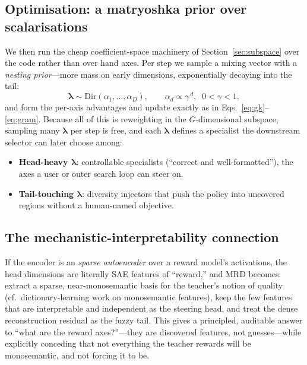 \documentclass[11pt,a4paper]{article}
\begin{document}
\subsection{Optimisation: a matryoshka prior over scalarisations}

We then run the cheap coefficient-space machinery of
Section~\ref{sec:subspace} over the code rather than over hand axes.  Per
step we sample a mixing vector with a \emph{nesting prior}---more mass on
early dimensions, exponentially decaying into the tail:
\begin{equation}
  \bm\lambda \sim \mathrm{Dir}(\alpha_1,\dots,\alpha_D),
  \qquad \alpha_d \propto \gamma^{\,d},\;\; 0<\gamma<1,
\end{equation}
and form the per-axis advantages and update exactly as in
Eqs.~\eqref{eq:gk}--\eqref{eq:gram}.  Because all of this is reweighting in
the $G$-dimensional subspace, sampling many $\bm\lambda$ per step is free,
and each $\bm\lambda$ defines a specialist the downstream selector can later
choose among:

\begin{itemize}[nosep]
\item \textbf{Head-heavy $\bm\lambda$}: controllable specialists (``correct
  and well-formatted''), the axes a user or outer search loop can steer on.
\item \textbf{Tail-touching $\bm\lambda$}: diversity injectors that push the
  policy into uncovered regions without a human-named objective.
\end{itemize}

\subsection{The mechanistic-interpretability connection}

If the encoder is an \emph{sparse autoencoder} over a reward model's
activations, the head dimensions are literally SAE features of ``reward,''
and MRD becomes: extract a sparse, near-monosemantic basis for the teacher's
notion of quality (cf.\ dictionary-learning work on monosemantic features),
keep the few features that are interpretable and independent as the steering
head, and treat the dense reconstruction residual as the fuzzy tail.  This
gives a principled, auditable answer to ``what are the reward axes?''---they
are discovered features, not guesses---while explicitly conceding that not
everything the teacher rewards will be monosemantic, and not forcing it to
be.
\end{document}

